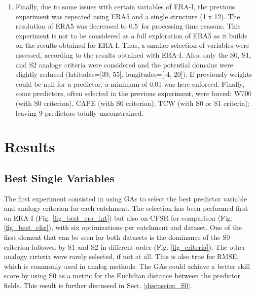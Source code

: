 \documentclass[draft]{agujournal2019}
\begin{document}
\begin{enumerate}
	\item Finally, due to some issues with certain variables of ERA-I, the previous experiment was repeated using ERA5 and a single structure (1 x 12). The resolution of ERA5 was decreased to 0.5\degree\ for processing time reasons. This experiment is not to be considered as a full exploration of ERA5 as it builds on the results obtained for ERA-I. Thus, a smaller selection of variables were assessed, according to the results obtained with ERA-I. Also, only the S0, S1, and S2 analogy criteria were considered and the potential domains were slightly reduced (latitudes=[39, 55], longitudes=[-4, 20]). If previously weights could be null for a predictor, a minimum of 0.01 was here enforced. Finally, some predictors, often selected in the previous experiment, were forced: W700 (with S0 criterion), CAPE (with S0 criterion), TCW (with S0 or S1 criteria); leaving 9 predictors totally unconstrained.
\end{enumerate}


\section{Results}
\label{results}

\subsection{Best Single Variables}
\label{best_single}

The first experiment consisted in using GAs to select the best predictor variable and analogy criterion for each catchment. The selection has been performed first on ERA-I (Fig. \ref{fig_best_era_int}) but also on CFSR for comparison (Fig. \ref{fig_best_cfsr}), with six optimizations per catchment and dataset. One of the first element that can be seen for both datasets is the dominance of the S0 criterion followed by S1 and S2 in different order (Fig. \ref{fig_criteria}). The other analogy cirteria were rarely selected, if not at all. This is also true for RMSE, which is commonly used in analog methods. The GAs could achieve a better skill score by using S0 as a metric for the Euclidian distance between the predictor fields. This result is further discussed in Sect. \ref{discussion_S0}.
\end{document}
